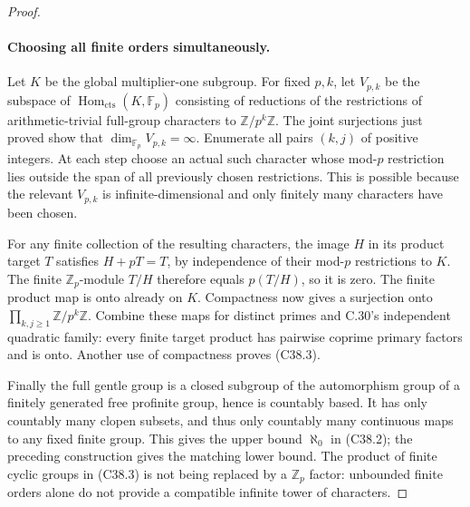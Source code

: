 \begin{proof}
\paragraph{Choosing all finite orders simultaneously.}
Let \(K\) be the global multiplier-one subgroup.
For fixed \(p,k\), let \(V_{p,k}\) be the subspace of
\(\operatorname{Hom}_{\mathrm{cts}}(K,\mathbb F_p)\)
consisting of reductions of the restrictions of
arithmetic-trivial full-group characters to
\(\mathbb Z/p^k\mathbb Z\).
The joint surjections just proved show that
\(\dim_{\mathbb F_p}V_{p,k}=\infty\).
Enumerate all pairs \((k,j)\) of positive integers.
At each step choose an actual such character whose
mod-\(p\) restriction lies outside the span of all
previously chosen restrictions.
This is possible because the relevant \(V_{p,k}\)
is infinite-dimensional and only finitely many
characters have been chosen.

For any finite collection of the resulting characters,
the image \(H\) in its product target \(T\) satisfies
\(H+pT=T\), by independence of their mod-\(p\)
restrictions to \(K\).
The finite \(\mathbb Z_p\)-module \(T/H\) therefore
equals \(p(T/H)\), so it is zero.
The finite product map is onto already on \(K\).
Compactness now gives a surjection onto
\(\prod_{k,j\geq1}\mathbb Z/p^k\mathbb Z\).
Combine these maps for distinct primes and C.30's
independent quadratic family: every finite target
product has pairwise coprime primary factors and is
onto.  Another use of compactness proves (C38.3).

Finally the full gentle group is a closed subgroup
of the automorphism group of a finitely generated
free profinite group, hence is countably based.
It has only countably many clopen subsets, and thus
only countably many continuous maps to any fixed
finite group.  This gives the upper bound
\(\aleph_0\) in (C38.2); the preceding construction
gives the matching lower bound.
The product of finite cyclic groups in (C38.3)
is not being replaced by a \(\mathbb Z_p\) factor:
unbounded finite orders alone do not provide a
compatible infinite tower of characters.
\end{proof}


